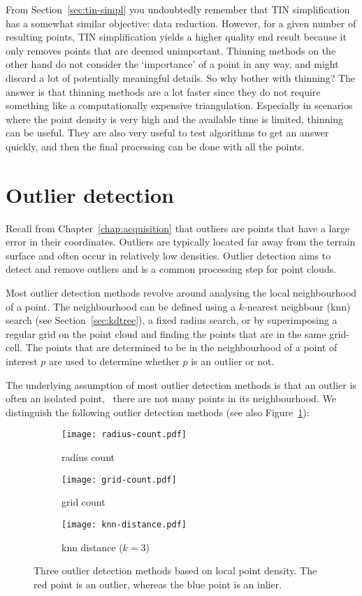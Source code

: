 From Section~\ref{sec:tin-simpl} you undoubtedly remember that TIN simplification has a somewhat similar objective: data reduction. 
However, for a given number of resulting points, TIN simplification yields a higher quality end result because it only removes points that are deemed unimportant.
Thinning methods on the other hand do not consider the `importance' of a point in any way, and might discard a lot of potentially meaningful details.
So why bother with thinning? The answer is that thinning methods are a lot faster since they do not require something like a computationally expensive triangulation.
Especially in scenarios where the point density is very high and the available time is limited, thinning can be useful.
They are also very useful to test algorithms to get an answer quickly, and then the final processing can be done with all the points.


%
\section{Outlier detection}%
\label{sec:outlier_detection}

Recall from Chapter~\ref{chap:acquisition} that outliers are points that have a large error in their coordinates.
Outliers are typically located far away from the terrain surface and often occur in relatively low densities.
Outlier detection aims to detect and remove outliers and is a common processing step for point clouds.

Most outlier detection methods revolve around analysing the local neighbourhood of a point.
The neighbourhood can be defined using a $k$-nearest neighbour (knn) search (see Section~\ref{sec:kdtree}), a fixed radius search, or by superimposing a regular grid on the point cloud and finding the points that are in the same grid-cell.
The points that are determined to be in the neighbourhood of a point of interest $p$ are used to determine whether $p$ is an outlier or not.

The underlying assumption of most outlier detection methods is that an outlier is often an isolated point, \ie\ there are not many points in its neighbourhood. We distinguish the following outlier detection methods (see also Figure~\ref{fig:outlier-detection}):
\begin{figure}
  \centering
  \begin{subfigure}[b]{0.3\linewidth}
    \centering
    \texttt{[image: radius-count.pdf]}
    \caption{radius count}
  \end{subfigure}
  \begin{subfigure}[b]{0.3\linewidth}
    \centering
    \texttt{[image: grid-count.pdf]}
    \caption{grid count}
  \end{subfigure}
  \begin{subfigure}[b]{0.3\linewidth}
    \centering
    \texttt{[image: knn-distance.pdf]}
    \caption{knn distance ($k=3$)}
  \end{subfigure}
\caption{Three outlier detection methods based on local point density. The red point is an outlier, whereas the blue point is an inlier.}%
\label{fig:outlier-detection}
\end{figure}

